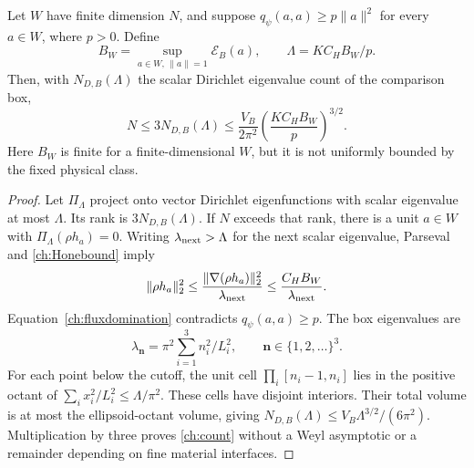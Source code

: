 \begin{theorem}
\label{ch:resourcecount}
Let $W$ have finite dimension $N$, and suppose
$q_\psi(a,a)\geq p\|a\|^2$ for every $a\in W$, where $p>0$.
Define
\begin{equation}
 B_W=\sup_{a\in W,\,\|a\|=1}\mathcal E_B(a),\qquad
 \Lambda=K C_H B_W/p.
 \label{ch:cutoff}
\end{equation}
Then, with $N_{D,B}(\Lambda)$ the scalar Dirichlet eigenvalue count of the
comparison box,
\begin{equation}
 N\leq 3N_{D,B}(\Lambda)
 \leq\frac{V_B}{2\pi^2}\left(\frac{K C_H B_W}{p}\right)^{3/2}.
 \label{ch:count}
\end{equation}
Here $B_W$ is finite for a finite-dimensional $W$, but it is not uniformly
bounded by the fixed physical class.
\end{theorem}
\begin{proof}
Let $\Pi_\Lambda$ project onto vector Dirichlet eigenfunctions with scalar
eigenvalue at most $\Lambda$.  Its rank is $3N_{D,B}(\Lambda)$.
If $N$ exceeds that rank, there is a unit $a\in W$ with
$\Pi_\Lambda(\rho h_a)=0$.  Writing $\lambda_{\rm next}>\Lambda$ for
the next scalar eigenvalue, Parseval and \eqref{ch:Honebound} imply
\begin{equation}
 \|\rho h_a\|_2^2\leq
 \frac{\|\nabla(\rho h_a)\|_2^2}{\lambda_{\rm next}}
 \leq\frac{C_HB_W}{\lambda_{\rm next}}.
 \label{ch:tail}
\end{equation}
Equation~\eqref{ch:fluxdomination} contradicts $q_\psi(a,a)\geq p$.
The box eigenvalues are
\begin{equation}
 \lambda_{\mathbf n}=\pi^2\sum_{i=1}^3 n_i^2/L_i^2,
 \qquad\mathbf n\in\{1,2,\ldots\}^3.
 \label{ch:boxspectrum}
\end{equation}
For each point below the cutoff, the unit cell
$\prod_i[n_i-1,n_i]$ lies in the positive octant of
$\sum_i x_i^2/L_i^2\leq\Lambda/\pi^2$.  These cells have disjoint
interiors.  Their total volume is at most the ellipsoid-octant volume,
giving $N_{D,B}(\Lambda)\leq V_B\Lambda^{3/2}/(6\pi^2)$.
Multiplication by three proves \eqref{ch:count} without a Weyl asymptotic
or a remainder depending on fine material interfaces.
\end{proof}

